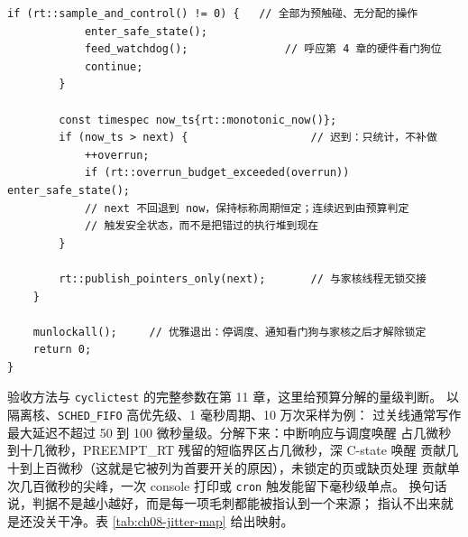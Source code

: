 \documentclass[12pt,a4paper,fontset=fandol]{ctexbook}
\newcommand{\Tp}[1]{\texttt{#1}}
\begin{document}
\begin{lstlisting}[style=cppstyle,caption={C++：绝对周期实时循环骨架},label={lst:ch08-loop}]
		if (rt::sample_and_control() != 0) {   // 全部为预触碰、无分配的操作
			enter_safe_state();
			feed_watchdog();               // 呼应第 4 章的硬件看门狗位
			continue;
		}

		const timespec now_ts{rt::monotonic_now()};
		if (now_ts > next) {                   // 迟到：只统计，不补做
			++overrun;
			if (rt::overrun_budget_exceeded(overrun)) enter_safe_state();
			// next 不回退到 now，保持标称周期恒定；连续迟到由预算判定
			// 触发安全状态，而不是把错过的执行堆到现在
		}

		rt::publish_pointers_only(next);       // 与家核线程无锁交接
	}

	munlockall();     // 优雅退出：停调度、通知看门狗与家核之后才解除锁定
	return 0;
}
\end{lstlisting}

验收方法与 \Tp{cyclictest} 的完整参数在第 11 章，这里给预算分解的量级判断。
以隔离核、\Tp{SCHED\_FIFO} 高优先级、1 毫秒周期、10 万次采样为例：
过关线通常写作最大延迟不超过 50 到 100 微秒量级。分解下来：中断响应与调度唤醒
占几微秒到十几微秒，PREEMPT\_RT 残留的短临界区占几微秒，深 C-state 唤醒
贡献几十到上百微秒（这就是它被列为首要开关的原因），未锁定的页或缺页处理
贡献单次几百微秒的尖峰，一次 console 打印或 \Tp{cron} 触发能留下毫秒级单点。
换句话说，判据不是越小越好，而是每一项毛刺都能被指认到一个来源；
指认不出来就是还没关干净。表 \ref{tab:ch08-jitter-map} 给出映射。
\end{document}
